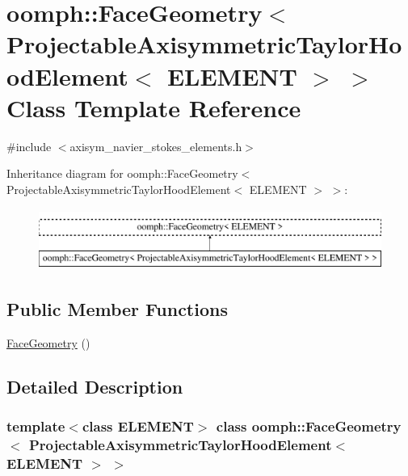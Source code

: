 \hypertarget{classoomph_1_1FaceGeometry_3_01ProjectableAxisymmetricTaylorHoodElement_3_01ELEMENT_01_4_01_4}{}\section{oomph\+:\+:Face\+Geometry$<$ Projectable\+Axisymmetric\+Taylor\+Hood\+Element$<$ E\+L\+E\+M\+E\+NT $>$ $>$ Class Template Reference}
\label{classoomph_1_1FaceGeometry_3_01ProjectableAxisymmetricTaylorHoodElement_3_01ELEMENT_01_4_01_4}


{\ttfamily \#include $<$axisym\+\_\+navier\+\_\+stokes\+\_\+elements.\+h$>$}

Inheritance diagram for oomph\+:\+:Face\+Geometry$<$ Projectable\+Axisymmetric\+Taylor\+Hood\+Element$<$ E\+L\+E\+M\+E\+NT $>$ $>$\+:\begin{figure}[H]
\begin{center}
\leavevmode
\includegraphics[height=2.000000cm]{classoomph_1_1FaceGeometry_3_01ProjectableAxisymmetricTaylorHoodElement_3_01ELEMENT_01_4_01_4}
\end{center}
\end{figure}
\subsection*{Public Member Functions}
\begin{DoxyCompactItemize}
\item 
\hyperlink{classoomph_1_1FaceGeometry_3_01ProjectableAxisymmetricTaylorHoodElement_3_01ELEMENT_01_4_01_4_a88cce7e1385334f182617c0512e6caa2}{Face\+Geometry} ()
\end{DoxyCompactItemize}


\subsection{Detailed Description}
\subsubsection*{template$<$class E\+L\+E\+M\+E\+NT$>$\newline
class oomph\+::\+Face\+Geometry$<$ Projectable\+Axisymmetric\+Taylor\+Hood\+Element$<$ E\+L\+E\+M\+E\+N\+T $>$ $>$}


